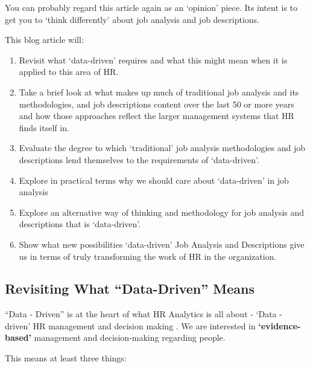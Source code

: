 \documentclass[12pt,letterpaper]{article}
\begin{document}
You can probably regard this article again as an `opinion' piece. Its
intent is to get you to `think differently' about job analysis and job
descriptions.


This blog article will:

\begin{enumerate}


\item
  Revisit what `data-driven' requires and what this might mean when it
  is applied to this area of HR.
\item
  Take a brief look at what makes up much of traditional job analysis
  and its methodologies, and job descriptions content over the last 50
  or more years and how those approaches reflect the larger management
  systems that HR finds itself in.
\item
  Evaluate the degree to which `traditional' job analysis methodologies
  and job descriptions lend themselves to the requirements of
  `data-driven'.
\item
  Explore in practical terms why we should care about `data-driven' in
  job analysis
\item
  Explore an alternative way of thinking and methodology for job
  analysis and descriptions that is `data-driven'.
\item
  Show what new possibilities `data-driven' Job Analysis and
  Descriptions give us in terms of truly transforming the work of HR in
  the organization.
\end{enumerate}
\subsection{Revisiting What ``Data-Driven''
Means}

``Data - Driven'' is at the heart of what HR Analytics is all about -
`Data - driven' HR management and decision making . We are interested in
\textbf{`evidence-based'} management and decision-making regarding
people.

This means at least three things:
\end{document}
